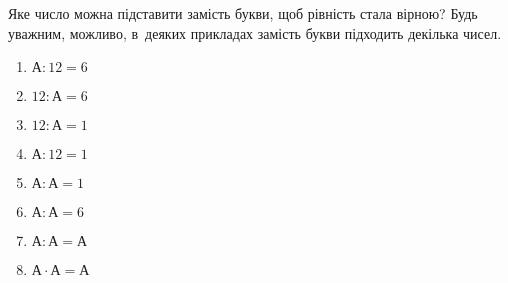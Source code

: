 \problem
Яке число можна підставити замість букви, щоб рівність стала вірною?
Будь уважним, можливо, в~деяких прикладах замість букви підходить декілька чисел.
\begin{multicols}{2}
    \begin{enumerate}
        \item $А : 12 = 6$
        \item $12 : А = 6$
        \item $12 : А = 1$
        \item $А : 12 = 1$
        \item $А : А = 1$
        \item $А : А = 6$
        \item $А : А = А$
        \item $А \cdot А = А$
    \end{enumerate}
\end{multicols}
